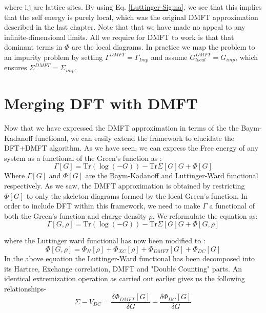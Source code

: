 \documentclass[10pt]{ruthesis}
\begin{document}
where i,j are lattice sites. By using Eq. \ref{Luttinger-Sigma}, we see that this implies that the self energy is purely local, which was the original DMFT approximation described in the last chapter. Note that that we have made no appeal to any infinite-dimensional limits. All we require for DMFT to work is that that dominant terms in $\Phi$ are the local diagrams. In practice we map the problem to an impurity problem by setting  $\Gamma^{DMFT}=\Gamma_{Imp}$ and assume $G^{DMFT}_{local}= G_{imp}$, which ensures $\Sigma^{DMFT}= \Sigma_{imp}$.
 
\section{Merging DFT with DMFT} 

Now that we have expressed the DMFT approximation in terms of the the Baym-Kadanoff functional, we can easily extend the framework to elucidate the DFT+DMFT algorithm. As we have seen, we can express the Free energy of any system as a functional of the Green's function as :
\begin{equation}
\Gamma[G]= \mathrm{Tr}(\log(-G)) -\mathrm{Tr} \Sigma[G]G +\Phi[G]
\end{equation}
Where $\Gamma[G]$ and $\Phi[G]$ are the Baym-Kadanoff and Luttinger-Ward functional respectively. As we saw, the DMFT approximation is obtained by restricting $\Phi[G]$ to only the skeleton diagrams formed by the local Green's function. In order to include DFT within this framework, we need to make $\Gamma$ a functional of both the Green's function and charge density $\rho$. We reformulate the equation as:
\begin{equation}
 \Gamma[G,\rho]= \mathrm{Tr}(\log(-G)) -\mathrm{Tr} \Sigma[G]G +\Phi[G,\rho]
\end{equation}  
 
 where the Luttinger ward functional has now been modified to :
 \begin{equation}
 \Phi[G,\rho]=\Phi_{H}[\rho]+\Phi_{XC}[\rho]+\Phi_{DMFT}[G]+\Phi_{DC}[G]
 \end{equation}
 In the above equation the Luttinger-Ward functional has been decomposed into its Hartree, Exchange correlation, DMFT and "Double Counting" parts.  An identical extremization operation as carried out earlier gives us the following relationships-
\begin{equation}\label{DMFT_SC}
 \Sigma-V_{DC}=  \dfrac{\delta \Phi_{DMFT}[G]}{\delta G}- \dfrac{\delta  \Phi_{DC}[G]}{\delta  G}
 \end{equation} 
 
\end{document}
